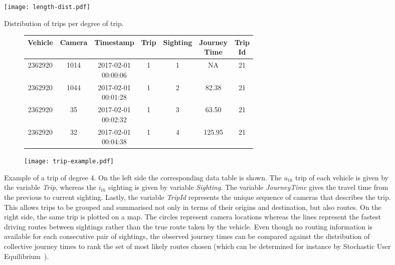 \begin{figure}[t]
  \centering
  \texttt{[image: length-dist.pdf]}
  \caption{Distribution of trips per degree of trip.}
  \label{fig:length-dist}
\end{figure}

\begin{figure*}[!ht]%
  \centering
  \begin{subfigure}[c]{.5\textwidth}
    \small
    \tabcolsep=0.09cm
    \begin{tabular}{c c c c c c c}
      \hline
      Vehicle & Camera & Timestamp & Trip & Sighting & \thead{Journey \\Time} & \thead{Trip \\Id}\\
      \hline
      2362920 & 1014 & \makecell{2017-02-01 \\ 00:00:06} &   1 &   1 & NA & 21 \\
      2362920 & 1044 & \makecell{2017-02-01 \\ 00:01:28} &   1 &   2 & 82.38 & 21 \\
      2362920 &  35 & \makecell{2017-02-01 \\ 00:02:32} &   1 &   3 & 63.50 & 21\\
      2362920 &  32 & \makecell{2017-02-01 \\ 00:04:38} &   1 &   4 & 125.95 & 21\\
       \hline
    \end{tabular}
    \label{fig:trip-example-table}
  \end{subfigure}\hfill
  \begin{subfigure}[c]{.48\textwidth}
    \centering
    \texttt{[image: trip-example.pdf]}
    \label{fig:trip-example-map}
  \end{subfigure}\hfill
  \caption{Example of a trip of degree 4. On the left side the corresponding data table is shown. The $u_{th}$ trip of each vehicle is given by the variable \emph{Trip}, whereas the $i_{th}$ sighting is given by variable \emph{Sighting}. The variable \emph{JourneyTime} gives the travel time from the previous to current sighting. Lastly, the variable \emph{TripId} represents the unique sequence of cameras that describes the trip. This allows trips to be grouped and summarised not only in terms of their origins and destination, but also routes. On the right side, the same trip is plotted on a map. The circles represent camera locations whereas the lines represent the fastest driving routes between sightings rather than the true route taken by the vehicle. Even though no routing information is available for each consecutive pair of sightings, the observed journey times can be compared against the distribution of collective journey times to rank the set of most likely routes chosen (which can be determined for instance by Stochastic User Equilibrium~\cite{Castillo2008}).}%
  \label{fig:trip-example}%
  \vspace{-0.40cm}
\end{figure*}
\vspace{-0.25cm}

